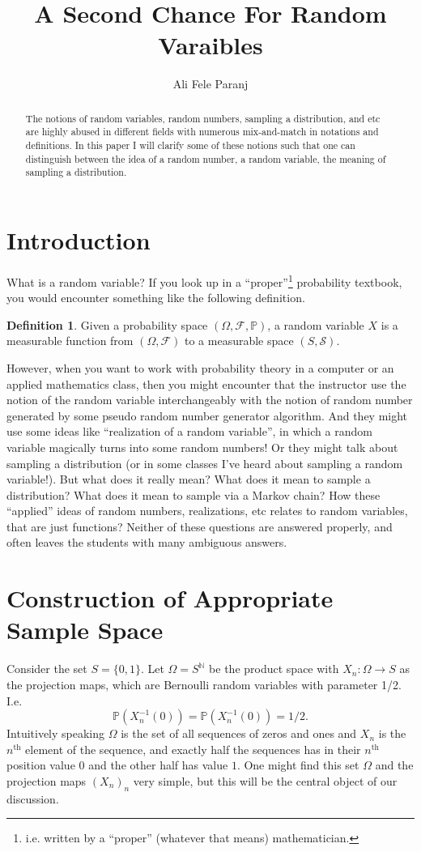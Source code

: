 \documentclass[11pt,a4paper]{article}
\title{A Second Chance For Random Varaibles}
\author{Ali Fele Paranj}
\theoremstyle{definition}
\newtheorem{defn}{Definition}
\theoremstyle{Example}
\newcommand{\PP}{\mathbb{P}}
\newcommand{\set}[1]{\{#1\}}
\newcommand{\N}{\mathbb{N}}
\begin{document}
	\maketitle
	\begin{abstract}
		The notions of random variables, random numbers, sampling a distribution, and etc are highly abused in different fields with numerous mix-and-match in notations and definitions. In this paper I will clarify some of these notions such that one can distinguish between the idea of a random number, a random variable, the meaning of sampling a distribution.
	\end{abstract}
	
	\section{Introduction}
	What is a random variable? If you look up in a ``proper''\footnote{i.e. written by a ``proper'' (whatever that means) mathematician.} probability textbook, you would encounter something like the following definition.
	
	\begin{defn}
		Given a probability space $ (\Omega,\mathcal{F},\mathbb{P}) $, a random variable $ X $ is a measurable function from $ (\Omega, \mathcal{F}) $ to a measurable space $ (S,\mathcal{S}) $. 
	\end{defn}
	
	However, when you want to work with probability theory in a computer or an applied mathematics class, then you might encounter that the instructor use the notion of the random variable interchangeably with the notion of random number generated by some pseudo random number generator algorithm. And they might use some ideas like ``realization of a random variable'', in which a random variable magically turns into some random numbers! Or they might talk about sampling a distribution (or in some classes I've heard about sampling a random variable!). But what does it really mean? What does it mean to sample a distribution? What does it mean to sample via a Markov chain? How these ``applied'' ideas of random numbers, realizations, etc relates to random variables, that are just functions? Neither of these questions are answered properly, and often leaves the students with many ambiguous answers.
	
	
	
	
	
	\section{Construction of Appropriate Sample Space}
	Consider the set $ S = \set{0,1} $. Let $ \Omega = S^\N $ be the product space with $ X_n:\Omega \to S $ as the projection maps, which are Bernoulli random variables with parameter 1/2. I.e.
	\[ \PP(X_n^{-1}(0)) = \PP(X_n^{-1}(0)) = 1/2. \]
	Intuitively speaking $ \Omega $ is the set of all sequences of zeros and ones and $ X_n $ is the $ n^\text{th} $ element of the sequence, and exactly half the sequences has in their $ n^\text{th} $ position value $ 0 $ and the other half has value $ 1 $. One might find this set $ \Omega $ and the projection maps $ (X_n)_n $ very simple, but this will be the central object of our discussion.
	
\end{document}
